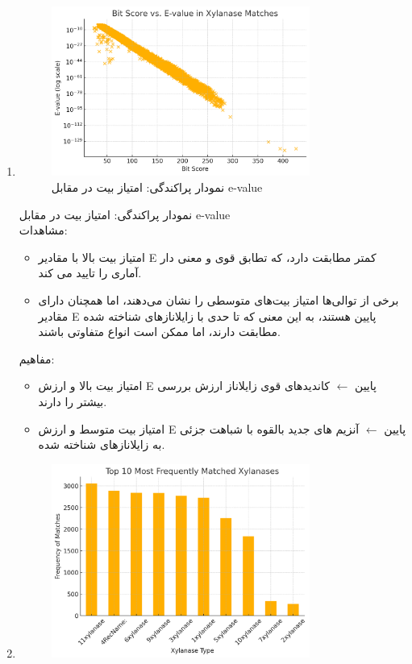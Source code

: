 \begin{enumerate}[label=\alph*-]
            \item 
            \begin{figure}[H]
                \centering
                \includegraphics[width=0.8\textwidth]{images/bitscore_evalue.png} %
                \caption{نمودار پراکندگی: امتیاز بیت در مقابل e-value}
                \label{fig:bitscore_evalue}
            \end{figure}
            نمودار پراکندگی: امتیاز بیت در مقابل e-value\\
            مشاهدات:
            \begin{itemize}
                \item امتیاز بیت بالا با مقادیر E کمتر مطابقت دارد، که تطابق قوی و معنی دار آماری را تایید می کند.
                \item برخی از توالی‌ها امتیاز بیت‌های متوسطی را نشان می‌دهند، اما همچنان دارای مقادیر E پایین هستند، به این معنی که تا حدی با زایلانازهای شناخته شده مطابقت دارند، اما ممکن است انواع متفاوتی باشند.
            \end{itemize}
            مفاهیم:
            \begin{itemize}
                \item امتیاز بیت بالا و ارزش E پایین $\leftarrow$ کاندیدهای قوی زایلاناز ارزش بررسی بیشتر را دارند.
                \item امتیاز بیت متوسط ​​و ارزش E پایین $\leftarrow$ آنزیم های جدید بالقوه با شباهت جزئی به زایلانازهای شناخته شده.
            \end{itemize}
            \item 
            \begin{figure}[H]
                \centering
                \includegraphics[width=0.8\textwidth]{images/top_freq.png} %

\end{figure}
\end{enumerate}
